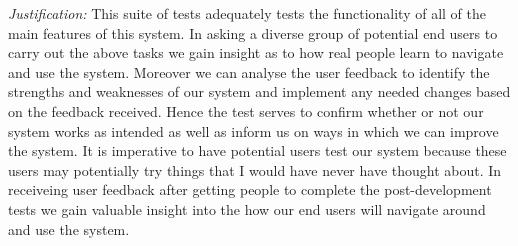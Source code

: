 
\textit{Justification:} This suite of tests adequately tests the
functionality of all of the main features of this system. In asking a 
diverse group of potential end users to carry out the above tasks 
we gain insight as to how real people learn to navigate and use
the system. Moreover we can analyse the user feedback to identify the
strengths and weaknesses of our system and implement any needed changes
based on the feedback received. Hence the test serves to confirm whether 
or not our system works as intended as well as inform us on ways in which
we can improve the system. It is imperative to have potential users test 
our system because these users may potentially try things that I would 
have never have thought about. In receiveing user feedback after getting
people to complete the post-development tests we gain valuable insight
into the how our end users will navigate around and use the system.

